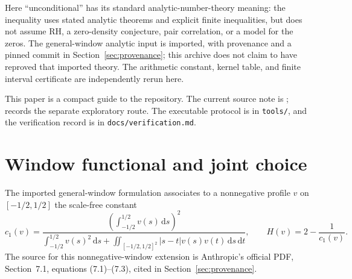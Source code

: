 \documentclass[11pt]{article}
\newcommand{\dd}{\,\mathrm{d}}
\begin{document}
Here ``unconditional'' has its standard analytic-number-theory meaning: the
inequality uses stated analytic theorems and explicit finite inequalities, but
does not assume RH, a zero-density conjecture, pair correlation, or a model for
the zeros.  The general-window analytic input is imported, with provenance and
a pinned commit in Section~\ref{sec:provenance}; this archive does not claim
to have reproved that imported theory.  The arithmetic constant, kernel table,
and finite interval certificate are independently rerun here.

This paper is a compact guide to the repository.  The current source note is
;  records the
separate exploratory route.  The executable protocol is in \texttt{tools/},
and the verification record is in \texttt{docs/verification.md}.

\section{Window functional and joint choice}
\label{sec:window}
The imported general-window formulation associates to a nonnegative profile
$v$ on $[-1/2,1/2]$ the scale-free constant
\begin{equation}
 c_1(v)=
 \frac{\left(\int_{-1/2}^{1/2}v(s)\dd s\right)^2}
 {\int_{-1/2}^{1/2}v(s)^2\dd s+
  \iint_{[-1/2,1/2]^2}|s-t|v(s)v(t)\dd s\dd t},
 \qquad H(v)=2-\frac1{c_1(v)}.
 \label{eq:c1}
\end{equation}
The source for this nonnegative-window extension is Anthropic's official PDF,
Section~7.1, equations (7.1)--(7.3), cited in Section~\ref{sec:provenance}.
\end{document}
